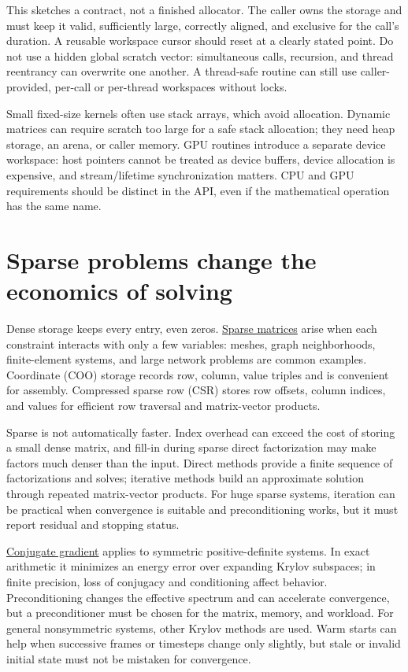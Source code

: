 This sketches a contract, not a finished allocator. The caller owns the storage and must keep it valid, sufficiently large, correctly aligned, and exclusive for the call's duration. A reusable workspace cursor should reset at a clearly stated point. Do not use a hidden global scratch vector: simultaneous calls, recursion, and thread reentrancy can overwrite one another. A thread-safe routine can still use caller-provided, per-call or per-thread workspaces without locks.

Small fixed-size kernels often use stack arrays, which avoid allocation. Dynamic matrices can require scratch too large for a safe stack allocation; they need heap storage, an arena, or caller memory. GPU routines introduce a separate device workspace: host pointers cannot be treated as device buffers, device allocation is expensive, and stream/lifetime synchronization matters. CPU and GPU requirements should be distinct in the API, even if the mathematical operation has the same name.

\section{Sparse problems change the economics of solving}\label{02-foundations-ii-ch038-sparse-problems-change-the-economics-of-solving}

Dense storage keeps every entry, even zeros. \hyperref[02-foundations-ii-ch038-sparse-storage-changes-the-cost-model]{Sparse matrices} arise when each constraint interacts with only a few variables: meshes, graph neighborhoods, finite-element systems, and large network problems are common examples. Coordinate (COO) storage records row, column, value triples and is convenient for assembly. Compressed sparse row (CSR) stores row offsets, column indices, and values for efficient row traversal and matrix-vector products.

Sparse is not automatically faster. Index overhead can exceed the cost of storing a small dense matrix, and fill-in during sparse direct factorization may make factors much denser than the input. Direct methods provide a finite sequence of factorizations and solves; iterative methods build an approximate solution through repeated matrix-vector products. For huge sparse systems, iteration can be practical when convergence is suitable and preconditioning works, but it must report residual and stopping status.

\hyperref[02-foundations-ii-ch038-sparse-storage-changes-the-cost-model]{Conjugate gradient} applies to symmetric positive-definite systems. In exact arithmetic it minimizes an energy error over expanding Krylov subspaces; in finite precision, loss of conjugacy and conditioning affect behavior. Preconditioning changes the effective spectrum and can accelerate convergence, but a preconditioner must be chosen for the matrix, memory, and workload. For general nonsymmetric systems, other Krylov methods are used. Warm starts can help when successive frames or timesteps change only slightly, but stale or invalid initial state must not be mistaken for convergence.

